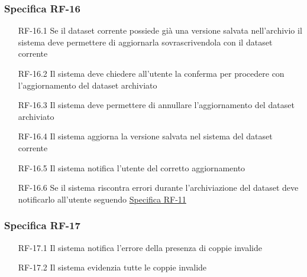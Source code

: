 \subsubsection{Specifica RF-16}
\label{subsubsec:RF-16}
\begin{enumerate}
    \item[RF-16.1] Se il dataset corrente possiede già una versione salvata nell'archivio il sistema deve permettere di aggiornarla sovrascrivendola con il dataset corrente
    \item[RF-16.2] Il sistema deve chiedere all'utente la conferma per procedere con l'aggiornamento del dataset archiviato
    \item[RF-16.3] Il sistema deve permettere di annullare l'aggiornamento del dataset archiviato
    \item[RF-16.4] Il sistema aggiorna la versione salvata nel sistema del dataset corrente
    \item[RF-16.5] Il sistema notifica l'utente del corretto aggiornamento
    \item[RF-16.6] Se il sistema riscontra errori durante l'archiviazione del dataset deve notificarlo all'utente seguendo \hyperref[subsubsec:RF-11]{Specifica RF-11}
\end{enumerate}

\subsubsection{Specifica RF-17}
\label{subsubsec:RF-17}
\begin{enumerate}
    \item[RF-17.1] Il sistema notifica l'errore della presenza di coppie invalide
    \item[RF-17.2] Il sistema evidenzia tutte le coppie invalide
\end{enumerate}


